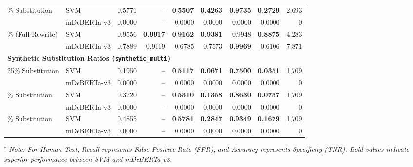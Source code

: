 \begin{table}[H]
{\begin{tabular}{llrrrrrrr}
\addlinespace
75\% Substitution            & SVM         & 0.5771 & -- & \textbf{0.5507} & \textbf{0.4263} & \textbf{0.9735} & \textbf{0.2729} &  2,693 \\
                             & mDeBERTa-v3 & 0.0000 & -- & 0.0000 & 0.0000 & 0.0000 & 0.0000 &      0 \\
\addlinespace
100\% (Full Rewrite)         & SVM         & 0.9556 & \textbf{0.9917} & \textbf{0.9162} & \textbf{0.9381} & 0.9948 & \textbf{0.8875} &  4,283 \\
                             & mDeBERTa-v3 & 0.7889 & 0.9119 & 0.6785 & 0.7573 & \textbf{0.9969} & 0.6106 &  7,871 \\
\midrule
\multicolumn{9}{l}{\textbf{Synthetic Substitution Ratios (\texttt{synthetic\_multi})}} \\
25\% Substitution            & SVM         & 0.1950 & -- & \textbf{0.5117} & \textbf{0.0671} & \textbf{0.7500} & \textbf{0.0351} &  1,709 \\
                             & mDeBERTa-v3 & 0.0000 & -- & 0.0000 & 0.0000 & 0.0000 & 0.0000 &      0 \\
\addlinespace
50\% Substitution            & SVM         & 0.3220 & -- & \textbf{0.5310} & \textbf{0.1358} & \textbf{0.8630} & \textbf{0.0737} &  1,709 \\
                             & mDeBERTa-v3 & 0.0000 & -- & 0.0000 & 0.0000 & 0.0000 & 0.0000 &      0 \\
\addlinespace
75\% Substitution            & SVM         & 0.4855 & -- & \textbf{0.5781} & \textbf{0.2847} & \textbf{0.9349} & \textbf{0.1679} &  1,709 \\
                             & mDeBERTa-v3 & 0.0000 & -- & 0.0000 & 0.0000 & 0.0000 & 0.0000 &      0 \\
\bottomrule
\end{tabular}%
}
\vspace{3pt}
\hfill \footnotesize\textit{$^\dagger$ Note: For Human Text, Recall represents False Positive Rate (FPR), and Accuracy represents Specificity (TNR). Bold values indicate superior performance between SVM and mDeBERTa-v3.}
\end{table}
